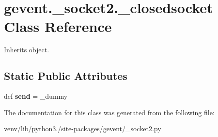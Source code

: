 \hypertarget{classgevent_1_1__socket2_1_1__closedsocket}{}\section{gevent.\+\_\+socket2.\+\_\+closedsocket Class Reference}
\label{classgevent_1_1__socket2_1_1__closedsocket}


Inherits object.

\subsection*{Static Public Attributes}
\begin{DoxyCompactItemize}
\item 
\mbox{\label{classgevent_1_1__socket2_1_1__closedsocket_ac3319e3f336bafbae1f54131956999ea}} 
def {\bfseries send} = \+\_\+dummy
\end{DoxyCompactItemize}


The documentation for this class was generated from the following file\+:\begin{DoxyCompactItemize}
\item 
venv/lib/python3./site-\/packages/gevent/\+\_\+socket2.\+py\end{DoxyCompactItemize}
